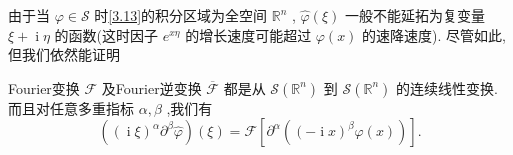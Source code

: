 \documentclass[lang=cn,newtx,10pt,scheme=chinese,thmcnt=chapter]{elegantbook}
\newcommand{\ci}{\operatorname{i}}
\begin{document}
由于当 \(\varphi  \in  \mathcal{S}\) 时\ref{3.13}的积分区域为全空间 \({\mathbb{R}}^{n}\) , \(\widehat{\varphi }\left( \xi \right)\) 一般不能延拓为复变量 \(\xi  + {\ci\eta }\) 的函数(这时因子 \({e}^{x\eta }\) 的增长速度可能超过 \(\varphi \left( x\right)\) 的速降速度). 尽管如此, 但我们依然能证明
\begin{lemma}
  Fourier变换 \(\mathcal{F}\) 及Fourier逆变换 \(\overline{\mathcal{F}}\) 都是从 \(\mathcal{S}\left( {\mathbb{R}}^{n}\right)\) 到 \(\mathcal{S}\left( {\mathbb{R}}^{n}\right)\) 的连续线性变换. 而且对任意多重指标 \(\alpha ,\beta\) ,我们有
\begin{equation}
\left( {{\left( \ci\xi \right) }^{\alpha }{\partial }^{\beta }\widehat{\varphi }}\right) \left( \xi \right)  = \mathcal{F}\left\lbrack  {{\partial }^{\alpha }\left( {{\left( -\ci x\right) }^{\beta }\varphi \left( x\right) }\right) }\right\rbrack  . \label{3.14}
\end{equation}
\end{lemma}
\end{document}
